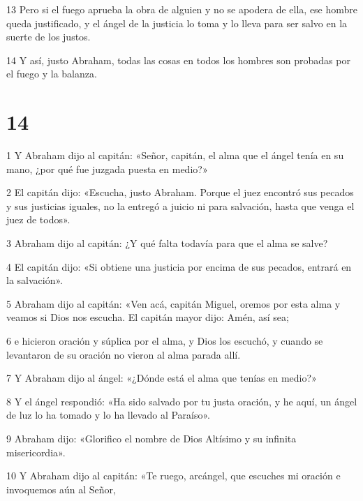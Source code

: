 \par 13 Pero si el fuego aprueba la obra de alguien y no se apodera de ella, ese hombre queda justificado, y el ángel de la justicia lo toma y lo lleva para ser salvo en la suerte de los justos.

\par 14 Y así, justo Abraham, todas las cosas en todos los hombres son probadas por el fuego y la balanza.

\chapter{14}

\par 1 Y Abraham dijo al capitán: «Señor, capitán, el alma que el ángel tenía en su mano, ¿por qué fue juzgada puesta en medio?»

\par 2 El capitán dijo: «Escucha, justo Abraham. Porque el juez encontró sus pecados y sus justicias iguales, no la entregó a juicio ni para salvación, hasta que venga el juez de todos».

\par 3 Abraham dijo al capitán: ¿Y qué falta todavía para que el alma se salve?

\par 4 El capitán dijo: «Si obtiene una justicia por encima de sus pecados, entrará en la salvación».

\par 5 Abraham dijo al capitán: «Ven acá, capitán Miguel, oremos por esta alma y veamos si Dios nos escucha. El capitán mayor dijo: Amén, así sea;

\par 6 e hicieron oración y súplica por el alma, y ​​Dios los escuchó, y cuando se levantaron de su oración no vieron al alma parada allí.

\par 7 Y Abraham dijo al ángel: «¿Dónde está el alma que tenías en medio?»

\par 8 Y el ángel respondió: «Ha sido salvado por tu justa oración, y he aquí, un ángel de luz lo ha tomado y lo ha llevado al Paraíso».

\par 9 Abraham dijo: «Glorifico el nombre de Dios Altísimo y su infinita misericordia».

\par 10 Y Abraham dijo al capitán: «Te ruego, arcángel, que escuches mi oración e invoquemos aún al Señor,

